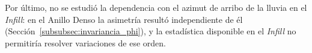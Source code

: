 {\leavevmode\color{blue}Por último, no se estudió la dependencia con el azimut de arribo de la lluvia en el \textit{Infill}: en el Anillo Denso la asimetría resultó independiente de él (Sección~\ref{subsubsec:invariancia_phi}), y la estadística disponible en el \textit{Infill} no permitiría resolver variaciones de ese orden.}


\newpage
